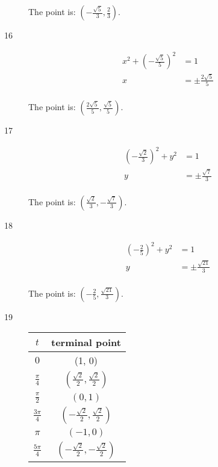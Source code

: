 \documentclass{exam}
\begin{document}
\begin{description}
        The point is: $\boxed{ \left( - \frac{\sqrt{5}}{3}, \frac{2}{3} \right) }$.

      \item[16]
        \begin{align*}
          x^2 + \left( - \frac{\sqrt{5}}{5} \right)^2 & = 1 \\
          x                                  & = \pm \frac{2 \sqrt{5}}{5} \\
        \end{align*}

        The point is: $\boxed{ \left( \frac{2 \sqrt{5}}{5}, \frac{\sqrt{5}}{5} \right) }$.

      \item[17]
        \begin{align*}
          \left( - \frac{\sqrt{2}}{3} \right)^2 + y^2 & = 1 \\
          y                                           & = \pm \frac{\sqrt{7}}{3} \\
        \end{align*}

        The point is: $\boxed{ \left( \frac{\sqrt{2}}{3}, - \frac{\sqrt{7}}{3} \right) }$.

      \item[18]
        \begin{align*}
          \left( - \frac{2}{5} \right)^2 + y^2 & = 1 \\
          y                                    & = \pm \frac{\sqrt{21}}{3} \\
        \end{align*}

        The point is: $\boxed{ \left( - \frac{2}{5}, \frac{\sqrt{21}}{3} \right) }$.

      \item[19]
        \begin{tabular}{cc}
          \toprule
          $t$ & terminal point \\
          \midrule
          $0$ & (1, 0) \\
          $\frac{\pi}{4}$ & $\left( \frac{\sqrt{2}}{2}, \frac{\sqrt{2}}{2} \right)$ \\

          $\frac{\pi}{2}$ & $\left( 0, 1 \right)$ \\
          $\frac{3 \pi}{4}$ & $\left( -\frac{\sqrt{2}}{2}, \frac{\sqrt{2}}{2} \right)$ \\

          $\pi$ & $\left( -1, 0 \right)$ \\
          $\frac{5 \pi}{4}$ & $\left( -\frac{\sqrt{2}}{2}, -\frac{\sqrt{2}}{2} \right)$ \\


\end{tabular}
\end{description}
\end{document}
